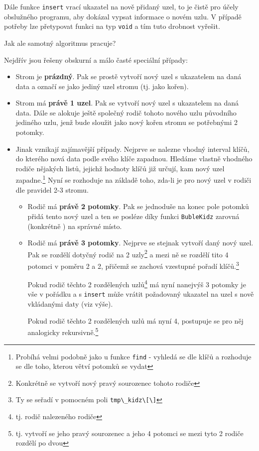 \documentclass[11pt,a4paper]{article}
\begin{document}
Dále funkce \verb~insert~ vrací ukazatel na nově přidaný uzel, to je čistě pro účely obslužného programu, aby dokázal vypsat informace o novém uzlu.
V případě potřeby lze přetypovat funkci na typ \verb~void~ a tím tuto drobnost vyřešit.

Jak ale samotný algoritmus pracuje?

Nejdřív jsou řešeny obskurní a málo časté speciální případy:

\renewcommand{\labelitemi}{$\sharp$}

\begin{itemize}
\item Strom je \textbf{prázdný}.
Pak se prostě vytvoří nový uzel s ukazatelem na daná data a označí se jako
jediný uzel stromu (tj. jako kořen).
\item Strom má \textbf{právě 1 uzel}.
Pak se vytvoří nový uzel s ukazatelem na daná data.
Dále se alokuje ještě společný rodič tohoto nového uzlu původního jediného
uzlu, jenž bude sloužit jako nový kořen stromu se potřebnými 2 potomky.
\item Jinak vznikají zajímavější případy.
Nejprve se nalezne vhodný interval klíčů, do kterého nová data podle svého
klíče zapadnou.
Hledáme vlastně vhodného rodiče nějakých listů, jejichž hodnoty klíčů již
určují, kam nový uzel zapadne.\footnote{Probíhá velmi podobně jako u funkce
\verb~find~ - vyhledá se dle klíčů a rozhoduje se dle toho, kterou větví
potomků se vydat}
Nyní se rozhoduje na základě toho, zda-li je pro nový uzel  v rodiči
dle pravidel 2-3 stromu.
  \renewcommand{\labelitemii}{$\Xi$}
  \begin{itemize}
  \item Rodič má \textbf{právě 2 potomky}.
  Pak se jednoduše na konec pole potomků přidá tento nový uzel a ten se posléze
  díky funkci \verb~BubleKidz~ zarovná (konkrétně ) na správné
  místo.
  \item Rodič má \textbf{právě 3 potomky}.
  Nejprve se stejnak vytvoří daný nový uzel.
  Pak se rozdělí dotyčný rodič na 2 uzly\footnote{Konkrétně se vytvoří nový
  pravý sourozenec tohoto rodiče} a mezi ně se rozdělí tito 4 potomci v poměru
  2 a 2, přičemž se zachová vzestupné pořadí klíčů.\footnote{Ty se seřadí v
  pomocném poli \verb~tmp\_kidz\[\]~}

  Pokud rodič těchto 2 rozdělených uzlů\footnote{tj. rodič nalezeného rodiče}
  má nyní nanejvýš 3 potomky je vše v pořádku a s \verb~insert~ může vrátit
  požadovaný ukazatel na uzel s nově vkládanými daty (viz výše).

  Pokud rodič těchto 2 rozdělených uzlů má nyní 4, postupuje se pro něj
  analogicky rekursivně.\footnote{tj. vytvoří se jeho pravý sourozenec a jeho 4
  potomci se mezi tyto 2 rodiče rozdělí po dvou}
  \end{itemize}
\end{itemize}
\end{document}
